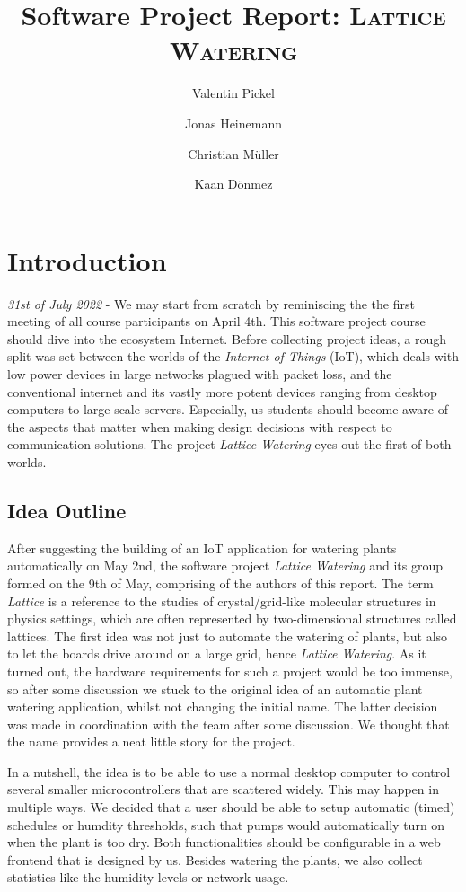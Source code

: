 \documentclass[acmtog, language=english, nonacm]{acmart}
\title{Software Project Report: \textsc{Lattice Watering}}
\author{Valentin Pickel}
\author{Jonas Heinemann}
\author{Christian Müller}
\author{Kaan Dönmez}
\affiliation{%
    \department[0]{Institute for Computer Science}%
    \institution{Freie Universität Berlin}%
    \city{Berlin}%
    \country{Germany}}
\begin{document}
    \maketitle

    \section{Introduction}

    \emph{31st of July 2022} - We may start from scratch by reminiscing the the first meeting of all course participants on April 4th. This software project course should dive into the ecosystem Internet. Before collecting project ideas, a rough split was set between the worlds of the \emph{Internet of Things} (IoT), which deals with low power devices in large networks plagued with packet loss, and the conventional internet and its vastly more potent devices ranging from desktop computers to large-scale servers. Especially, us students should become aware of the aspects that matter when making design decisions with respect to communication solutions. The project \emph{Lattice Watering} eyes out the first of both worlds.

    \subsection{Idea Outline}

    After suggesting the building of an IoT application for watering plants automatically on May 2nd, the software project \emph{Lattice Watering} and its group formed on the 9th of May, comprising of the authors of this report. The term \emph{Lattice} is a reference to the studies of crystal/grid-like molecular structures in physics settings, which are often represented by two-dimensional structures called lattices. The first idea was not just to automate the watering of plants, but also to let the boards drive around on a large grid, hence \emph{Lattice Watering}. As it turned out, the hardware requirements for such a project would be too immense, so after some discussion we stuck to the original idea of an automatic plant watering application, whilst not changing the initial name. The latter decision was made in coordination with the team after some discussion. We thought that the name provides a neat little story for the project.

    In a nutshell, the idea is to be able to use a normal desktop computer to control several smaller microcontrollers that are scattered widely. This may happen in multiple ways. We decided that a user should be able to setup automatic (timed) schedules or humdity thresholds, such that pumps would automatically turn on when the plant is too dry. Both functionalities should be configurable in a web frontend that is designed by us. Besides watering the plants, we also collect statistics like the humidity levels or network usage.
\end{document}
